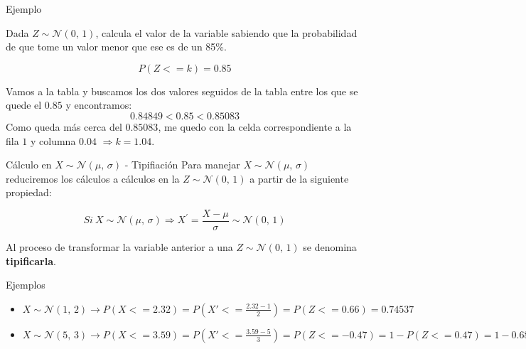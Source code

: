 \documentclass[11pt]{beamer}
\begin{document}
\begin{frame}{Ejemplo}

Dada $Z \sim \mathcal{N}(0,\,1)$, calcula el valor de la variable sabiendo que la probabilidad de que tome un valor menor que ese es de un 85\%. 

$$P(Z<=k)=0.85$$
    \begin{center}
        
    \end{center}

Vamos a la tabla y buscamos los dos valores seguidos de la tabla entre los que se quede el $0.85$ y encontramos:
$$0.84849 < 0.85 < 0.85083 $$
Como queda más cerca del $0.85083$, me quedo con la celda correspondiente a la fila $1$ y columna $0.04$  $\Rightarrow k=1.04$.
\end{frame}

\begin{frame}{Cálculo en $X \sim \mathcal{N}(\mu,\,\sigma)$ - Tipifiación}
Para manejar $X \sim \mathcal{N}(\mu,\,\sigma)$ reduciremos los cálculos a cálculos en la $Z \sim \mathcal{N}(0,\,1)$ a partir de la siguiente propiedad:

\begin{block}{}
$$ Si \  X \sim \mathcal{N}(\mu,\,\sigma) \Rightarrow X^{'}=\frac{X - \mu}{\sigma} \sim \mathcal{N}(0,\,1) $$
\end{block}

Al proceso de transformar la variable anterior a una $Z\sim \mathcal{N}(0,\,1)$ se denomina \textbf{tipificarla}.


\end{frame}



\begin{frame}{Ejemplos}

\begin{itemize}[<+->]
    \item $X \sim \mathcal{N}(1,\,2) \to P(X<=2.32)=P(X'<=\frac{2.32-1}{2})=P(Z<=0.66)=0.74537$
    \item $X \sim \mathcal{N}(5,\,3) \to P(X<=3.59)=P(X'<=\frac{3.59-5}{3})=P(Z<=-0.47)=1-P(Z<=0.47)=1-0.68082=0.31918$
\end{itemize}
\end{frame}
\end{document}
